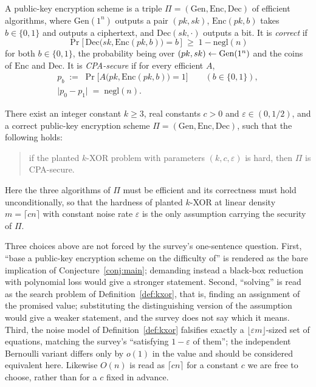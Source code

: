 \documentclass{aicr-conjecture}
\newcommand{\bits}{\{0,1\}}
\newcommand{\negl}{\mathrm{negl}}
\newcommand{\Gen}{\mathrm{Gen}}
\newcommand{\Enc}{\mathrm{Enc}}
\newcommand{\Dec}{\mathrm{Dec}}
\begin{document}
\begin{definition}\label{def:pke}
A public-key encryption scheme is a triple
$\Pi = (\Gen, \Enc, \Dec)$ of efficient algorithms, where $\Gen(1^n)$
outputs a pair $(pk, sk)$, $\Enc(pk, b)$ takes $b \in \bits$ and
outputs a ciphertext, and $\Dec(sk, \cdot)$ outputs a bit. It is
\emph{correct} if
\[
  \Pr\bigl[\,\Dec\bigl(sk, \Enc(pk, b)\bigr) = b\,\bigr]
  \;\ge\; 1 - \negl(n)
\]
for both $b \in \bits$, the probability being over
$(pk,sk) \sample \Gen(1^n)$ and the coins of $\Enc$ and $\Dec$. It is
\emph{CPA-secure} if for every efficient $A$,
\begin{gather*}
  p_b \;:=\; \Pr\bigl[A\bigl(pk, \Enc(pk,b)\bigr) = 1\bigr]
  \qquad (b \in \bits), \\
  \bigl| p_0 - p_1 \bigr| \;=\; \negl(n).
\end{gather*}
\end{definition}

\begin{conjecture}\label{conj:main}
There exist an integer constant $k \ge 3$, real constants $c > 0$ and
$\varepsilon \in (0,1/2)$, and a correct public-key encryption scheme
$\Pi = (\Gen,\Enc,\Dec)$, such that the following holds:
\begin{quote}
  if the planted $k$-XOR problem with parameters $(k,c,\varepsilon)$ is
  hard, then $\Pi$ is CPA-secure.
\end{quote}
Here the three algorithms of $\Pi$ must be efficient and its
correctness must hold unconditionally, so that the hardness of planted
$k$-XOR at linear density $m = \lceil cn \rceil$ with constant noise
rate $\varepsilon$ is the only assumption carrying the security of
$\Pi$.
\end{conjecture}

\begin{remark}\label{rem:readings}
Three choices above are not forced by the survey's one-sentence
question. First, ``base a public-key encryption scheme on the
difficulty of'' is rendered as the bare implication of
Conjecture~\ref{conj:main}; demanding instead a black-box reduction
with polynomial loss would give a stronger statement. Second,
``solving'' is read as the search problem of
Definition~\ref{def:kxor}, that is, finding an assignment of the
promised value; substituting the distinguishing version of the
assumption would give a weaker statement, and the survey does not say
which it means. Third, the noise model of Definition~\ref{def:kxor}
falsifies exactly a $\lfloor \varepsilon m \rfloor$-sized set of
equations, matching the survey's ``satisfying $1 - \varepsilon$ of
them''; the independent Bernoulli variant differs only by $o(1)$ in the
value and should be considered equivalent here. Likewise $O(n)$ is read
as $\lceil cn \rceil$ for a constant $c$ we are free to choose, rather
than for a $c$ fixed in advance.
\end{remark}
\end{document}
